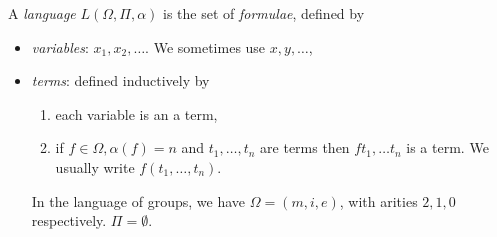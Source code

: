\documentclass[a4paper]{article}
\begin{document}
\begin{definition}[Language]
  A \emph{language} \(L(\Omega, \Pi, \alpha)\) is the set of \emph{formulae}, defined by
  \begin{itemize}
  \item \emph{variables}: \(x_1, x_2, \dots\). We sometimes use \(x, y, \dots\),
  \item \emph{terms}: defined inductively by
    \begin{enumerate}
    \item each variable is an a term,
    \item if \(f \in \Omega, \alpha(f) = n\) and \(t_1, \dots, t_n\) are terms then \(ft_1, \dots t_n\) is a term. We usually write \(f(t_1, \dots, t_n)\).
    \end{enumerate}
    \begin{eg}
      In the language of groups, we have \(\Omega = (m, i, e)\), with arities \(2, 1, 0\) respectively. \(\Pi = \emptyset\).


\end{eg}
\end{itemize}
\end{definition}
\end{document}
